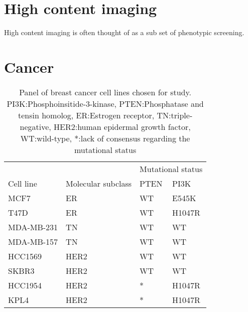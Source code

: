 \documentclass[a4paper,11pt,twoside,openright]{scrbook}
\begin{document}
\section{High content imaging}
High content imaging is often thought of as a sub set of phenotypic screening.

\section{Cancer}

\begin{table}[]
    \captionsetup{width=0.70\textwidth}
    \centering
    \caption[Panel of breast cancer cell lines chosen for study]{Panel of breast cancer cell lines chosen for study. PI3K:Phosphoinsitide-3-kinase, PTEN:Phosphatase and tensin homolog, ER:Estrogen receptor, TN:triple-negative, HER2:human epidermal growth factor, WT:wild-type, *:lack of consensus regarding the mutational status}
    \label{table:cell-lines}
    \begin{tabular}{@{}llll@{}}
    \toprule
               &                    & \multicolumn{2}{l}{Mutational status} \\
    Cell line  & Molecular subclass & PTEN             & PI3K               \\ \midrule
    MCF7       & ER                 & WT               & E545K              \\
    T47D       & ER                 & WT               & H1047R             \\
    MDA-MB-231 & TN                 & WT               & WT                 \\
    MDA-MB-157 & TN                 & WT               & WT                 \\
    HCC1569    & HER2               & WT               & WT                 \\
    SKBR3      & HER2               & WT               & WT                 \\
    HCC1954    & HER2               & *                & H1047R             \\
    KPL4       & HER2               & *                & H1047R             \\ \bottomrule
    \end{tabular}
    \end{table}


\end{document}
